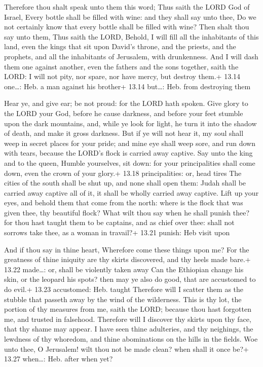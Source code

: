  Therefore thou shalt speak unto them this word; Thus
saith the LORD God of Israel, Every bottle shall be filled with wine:
and they shall say unto thee, Do we not certainly know that every bottle
shall be filled with wine?  Then shalt thou say unto them,
Thus saith the LORD, Behold, I will fill all the inhabitants of this
land, even the kings that sit upon David's throne, and the priests, and
the prophets, and all the inhabitants of Jerusalem, with drunkenness.
 And I will dash them one against another, even the fathers
and the sons together, saith the LORD: I will not pity, nor spare, nor
have mercy, but destroy them.+ 13.14 one\ldots: Heb. a man against his
brother+ 13.14 but\ldots: Heb. from destroying them

 Hear ye, and give ear; be not proud: for the LORD hath
spoken.  Give glory to the LORD your God, before he cause
darkness, and before your feet stumble upon the dark mountains, and,
while ye look for light, he turn it into the shadow of death, and make
it gross darkness.  But if ye will not hear it, my soul
shall weep in secret places for your pride; and mine eye shall weep
sore, and run down with tears, because the LORD's flock is carried away
captive.  Say unto the king and to the queen, Humble
yourselves, sit down: for your principalities shall come down, even the
crown of your glory.+ 13.18 principalities: or, head tires 
The cities of the south shall be shut up, and none shall open them:
Judah shall be carried away captive all of it, it shall be wholly
carried away captive.  Lift up your eyes, and behold them
that come from the north: where is the flock that was given thee, thy
beautiful flock?  What wilt thou say when he shall punish
thee? for thou hast taught them to be captains, and as chief over thee:
shall not sorrows take thee, as a woman in travail?+ 13.21 punish: Heb
visit upon

 And if thou say in thine heart, Wherefore come these
things upon me? For the greatness of thine iniquity are thy skirts
discovered, and thy heels made bare.+ 13.22 made\ldots: or, shall be
violently taken away  Can the Ethiopian change his skin, or
the leopard his spots? then may ye also do good, that are accustomed to
do evil.+ 13.23 accustomed: Heb. taught  Therefore will I
scatter them as the stubble that passeth away by the wind of the
wilderness.  This is thy lot, the portion of thy measures
from me, saith the LORD; because thou hast forgotten me, and trusted in
falsehood.  Therefore will I discover thy skirts upon thy
face, that thy shame may appear.  I have seen thine
adulteries, and thy neighings, the lewdness of thy whoredom, and thine
abominations on the hills in the fields. Woe unto thee, O Jerusalem!
wilt thou not be made clean? when shall it once be?+ 13.27 when\ldots:
Heb. after when yet?

